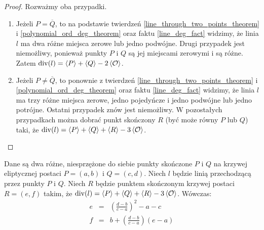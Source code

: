 \begin{proof}
Rozważmy oba przypadki.
\begin{enumerate}
\item
Jeżeli $P = \overline{Q}$,
to na podstawie twierdzeń
\ref{line_through_two_points_theorem} i \ref{polynomial_ord_deg_theorem}
oraz faktu \ref{line_deg_fact} widzimy,
że linia $l$ ma dwa różne miejsca zerowe lub jedno podwójne.
Drugi przypadek jest niemożliwy,
ponieważ punkty $P$ i $Q$ są jej miejscami zerowymi i są różne.
Zatem $\operatorname{div}(l) = \left\langle P\right\rangle + \left\langle Q\right\rangle - 2\left\langle\mathcal{O}\right\rangle$.
\item
Jeżeli $P \neq \overline{Q}$,
to ponownie z twierdzeń
\ref{line_through_two_points_theorem} i \ref{polynomial_ord_deg_theorem}
oraz faktu \ref{line_deg_fact} widzimy,
że linia $l$ ma trzy różne miejsca zerowe, jedno pojedyńcze i jedno podwójne
lub jedno potrójne.
Ostatni przypadek znów jest niemożliwy.
W pozostałych przypadkach można dobrać punkt skończony $R$
(być może równy $P$ lub $Q$) taki,
że $\operatorname{div}(l) = \left\langle P\right\rangle + \left\langle Q\right\rangle + \left\langle R\right\rangle - 3\left\langle\mathcal{O}\right\rangle$.
\end{enumerate}
\end{proof}

\begin{theorem}
Dane są dwa różne, niesprzężone do siebie
punkty skończone $P$ i $Q$ na krzywej eliptycznej
postaci $P = (a, b)$ i $Q = (c, d)$.
Niech $l$ będzie linią przechodzącą przez punkty $P$ i $Q$.
Niech $R$ będzie punktem skończonym krzywej postaci $R = (e, f)$ takim,
że $\operatorname{div}(l) = \left\langle P\right\rangle + \left\langle Q\right\rangle + \left\langle R\right\rangle - 3\left\langle\mathcal{O}\right\rangle$.
Wówczas:
\begin{eqnarray}
\label{chord_line_third_point_x_eqn}
e & = & \left(\frac{d-b}{c-a}\right)^2 - a - c \\
\label{chord_line_third_point_y_eqn}
f & = & b + \left(\frac{d-b}{c-a}\right)(e-a)
\end{eqnarray}
\end{theorem}

